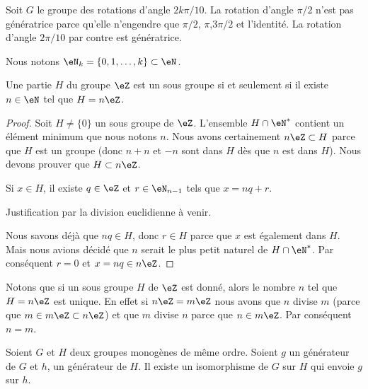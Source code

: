 \begin{example}
    Soit \( G\) le groupe des rotations d'angle \( 2k\pi/10\). La rotation d'angle \( \pi/2\) n'est pas génératrice parce qu'elle n'engendre que \( \pi/2\), \( \pi\),\( 3\pi/2\) et l'identité. La rotation d'angle \( 2\pi/10\) par contre est génératrice.
\end{example}


Nous notons \( \eN_{k}=\{ 0,1,\ldots, k \}\subset\eN\).
 
\begin{proposition} \label{PropSsgpZestnZ}
    Une partie \( H\) du groupe \( \eZ\) est un sous groupe si et seulement si il existe \( n\in\eN\) tel que \( H=n\eZ\).
\end{proposition}

\begin{proof}
    Soit \( H\neq\{ 0 \}\) un sous groupe de \( \eZ\). L'ensemble \( H\cap\eN^*\) contient un élément minimum que nous notons \( n\). Nous avons certainement \( n\eZ\subset H\) parce que \( H\) est un groupe (donc \( n+n\) et \( -n\) sont dans \( H\) dès que \( n\) est dans \( H\)). Nous devons prouver que \( H\subset n\eZ\).

    Si \( x\in H\), il existe \( q\in\eZ\) et \( r\in\eN_{n-1}\) tels que \( x=nq+r\).

    \begin{probleme}
        Justification par la division euclidienne à venir.
    \end{probleme}
    Nous savons déjà que \( nq\in H\), donc \( r\in H\) parce que \( x\) est également dans \( H\). Mais nous avions décidé que \( n\) serait le plus petit naturel de \( H\cap\eN^*\). Par conséquent \( r=0\) et \( x=nq\in n\eZ\).

\end{proof}

Notons que si un sous groupe \( H\) de \( \eZ\) est donné, alors le nombre \( n\) tel que \( H=n\eZ\) est unique. En effet si \( n\eZ=m\eZ\) nous avons que \( n\) divise \( m\) (parce que \( m\in m\eZ\subset n\eZ\)) et que \( m\) divise \( n\) parce que \( n\in m\eZ\). Par conséquent \( n=m\).

\begin{lemma}   \label{LemZhxMit}
    Soient \( G\) et \( H\) deux groupes monogènes de même ordre. Soient \( g\) un générateur de \( G\) et \( h\), un générateur de \( H\). Il existe un isomorphisme de \( G\) sur \( H\) qui envoie \( g\) sur \( h\).
\end{lemma}

